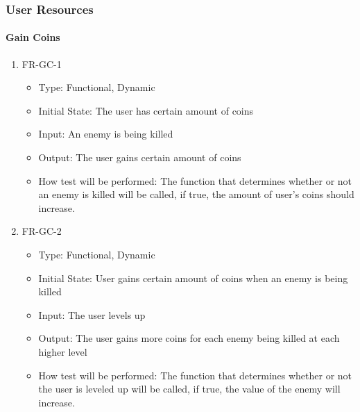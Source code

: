 \documentclass[12,english]{article}
\begin{document}
\subsubsection{User Resources}

\paragraph{Gain Coins}
\begin{enumerate}
  \item FR-GC-1
  \begin{itemize}
      \item Type: Functional, Dynamic
      \item Initial State: The user has certain amount of coins
      \item Input: An enemy is being killed 
      \item Output: The user gains certain amount of coins
      \item How test will be performed: The function that determines whether or not an enemy is killed will be called, if true, the amount of user’s coins should increase.  
  \end{itemize}
  \item FR-GC-2
  \begin{itemize}
      \item Type: Functional, Dynamic
      \item Initial State: User gains certain amount of coins when an enemy is being killed
      \item Input: The user levels up
      \item Output: The user gains more coins for each enemy being killed at each higher level 
      \item How test will be performed: The function that determines whether or not the user is leveled up will be called, if true, the value of the enemy will increase.  
  \end{itemize}
\end{enumerate}
\end{document}
